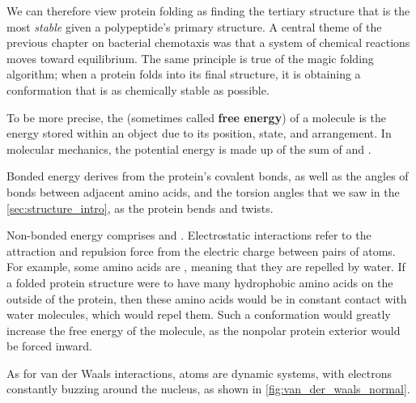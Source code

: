 We can therefore view protein folding as finding the tertiary structure that is the most \textit{stable} given a polypeptide's primary structure. A central theme of the previous chapter on bacterial chemotaxis was that a system of chemical reactions moves toward equilibrium. The same principle is true of the magic folding algorithm; when a protein folds into its final structure, it is obtaining a conformation that is as chemically stable as possible.

To be more precise, the  (sometimes called \textbf{free energy}) of a molecule is the energy stored within an object due to its position, state, and arrangement. In molecular mechanics, the potential energy is made up of the sum of  and .

Bonded energy derives from the protein's covalent bonds, as well as the angles of bonds between adjacent amino acids, and the torsion angles that we saw in the \autoref{sec:structure_intro}, as the protein bends and twists.

Non-bonded energy comprises  and . Electrostatic interactions refer to the attraction and repulsion force from the electric charge between pairs of atoms. For example, some amino acids are , meaning that they are repelled by water. If a folded protein structure were to have many hydrophobic amino acids on the outside of the protein, then these amino acids would be in constant contact with water molecules, which would repel them. Such a conformation would greatly increase the free energy of the molecule, as the nonpolar protein exterior would be forced inward.

As for van der Waals interactions, atoms are dynamic systems, with electrons constantly buzzing around the nucleus, as shown in \autoref{fig:van_der_waals_normal}.\\

